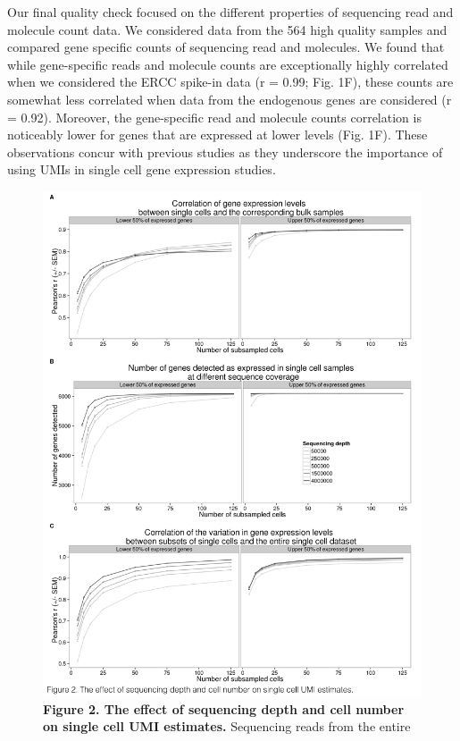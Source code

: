 Our final quality check focused on the different properties of
sequencing read and molecule count data. We considered data from the 564
high quality samples and compared gene specific counts of sequencing
read and molecules. We found that while gene-specific reads and molecule
counts are exceptionally highly correlated when we considered the ERCC
spike-in data (r = 0.99; Fig. 1F), these counts are somewhat less
correlated when data from the endogenous genes are considered (r =
0.92). Moreover, the gene-specific read and molecule counts correlation
is noticeably lower for genes that are expressed at lower levels (Fig.
1F). These observations concur with previous studies \citep{Islam2014,
Grun2014} as they underscore the importance of using UMIs in single
cell gene expression studies.

\begin{figure}[htbp]
\centering
\includegraphics[width=5in]{img/ch04/Figure02.jpeg}
\caption{\textbf{Figure 2. The effect of sequencing depth and cell
number on single cell UMI estimates.} Sequencing reads from the entire
}
\end{figure}
